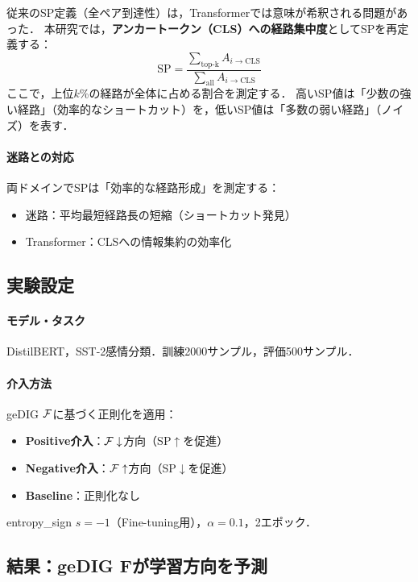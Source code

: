 従来のSP定義（全ペア到達性）は，Transformerでは意味が希釈される問題があった．
本研究では，\textbf{アンカートークン（CLS）への経路集中度}としてSPを再定義する：
\begin{equation}
\mathrm{SP} = \frac{\sum_{\mathrm{top\text{-}k}} A_{i \to \mathrm{CLS}}}{\sum_{\mathrm{all}} A_{i \to \mathrm{CLS}}}
\end{equation}
ここで，上位$k$\%の経路が全体に占める割合を測定する．
高いSP値は「少数の強い経路」（効率的なショートカット）を，低いSP値は「多数の弱い経路」（ノイズ）を表す．

\paragraph{迷路との対応}
両ドメインでSPは「効率的な経路形成」を測定する：
\begin{itemize}
    \item 迷路：平均最短経路長の短縮（ショートカット発見）
    \item Transformer：CLSへの情報集約の効率化
\end{itemize}

\subsection{実験設定}

\paragraph{モデル・タスク}
DistilBERT，SST-2感情分類．訓練2000サンプル，評価500サンプル．

\paragraph{介入方法}
geDIG $\mathcal{F}$に基づく正則化を適用：
\begin{itemize}
    \item \textbf{Positive介入}：$\mathcal{F} \downarrow$方向（SP$\uparrow$を促進）
    \item \textbf{Negative介入}：$\mathcal{F} \uparrow$方向（SP$\downarrow$を促進）
    \item \textbf{Baseline}：正則化なし
\end{itemize}
entropy\_sign $s = -1$（Fine-tuning用），$\alpha = 0.1$，2エポック．

\subsection{結果：geDIG Fが学習方向を予測}

